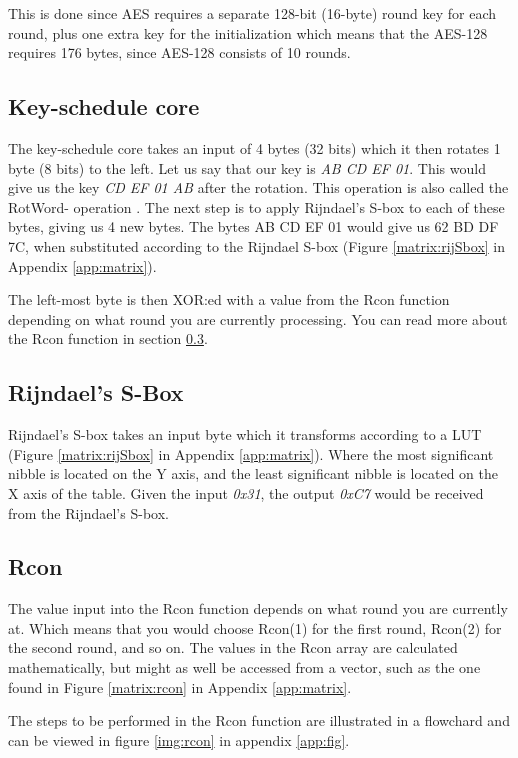 This is done since AES requires a separate 128-bit (16-byte) 
round key for each round, plus one extra key for the initialization 
which means that the AES-128 requires 176 bytes, since AES-128 consists
of 10 rounds.

\subsection{Key-schedule core}\label{sec:kCore}
The key-schedule core takes an input of 4 bytes (32 bits) which it 
then rotates 1 byte (8 bits) to the left. Let us say that our key is 
\emph{AB CD EF 01}. This would give us the key \emph{CD EF 01 AB} 
after the rotation. This operation is also called the RotWord-
operation \citep[p. 107]{Stinson:2006}. The next step is to apply 
Rijndael's S-box to each of these bytes, giving us 4 new bytes. The 
bytes {AB CD EF 01} would give us {62 BD DF 7C}, when substituted 
according to the Rijndael S-box (Figure \ref{matrix:rijSbox} in 
Appendix \ref{app:matrix}).

The left-most byte is then XOR:ed with a value from the Rcon function 
depending on what round you are currently processing. You can read 
more about the Rcon function in section \ref{ch:Rcon}.

\subsection{Rijndael's S-Box}
Rijndael's S-box takes an input byte which it transforms according to 
a LUT (Figure \ref{matrix:rijSbox} in Appendix \ref{app:matrix}). 
Where the most significant nibble is located on the Y axis, and the 
least significant nibble is located on the X axis of the table. Given 
the input \emph{0x31}, the output \emph{0xC7} would be received from 
the Rijndael's S-box.

\subsection{Rcon} \label{ch:Rcon}
The value input into the Rcon function depends on what round you are 
currently at. Which means that you would choose Rcon(1) for the first 
round, Rcon(2) for the second round, and so on. The values in the Rcon 
array are calculated mathematically, but might as well be accessed 
from a vector, such as the one found in Figure \ref{matrix:rcon} in 
Appendix \ref{app:matrix}.

The steps to be performed in the Rcon function are illustrated in a
flowchard and can be viewed in figure \ref{img:rcon} in appendix 
\ref{app:fig}.

